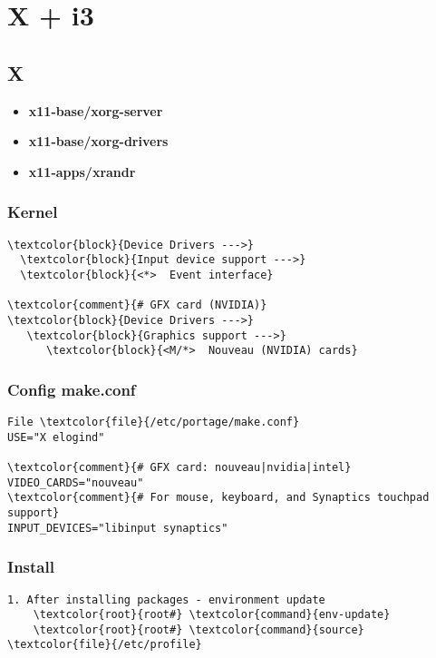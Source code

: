 \documentclass[10pt, a4paper, onecolumn, openany]{book}         %
\begin{document}
\chapter{X + i3}
\section{X}
\begin{itemize}
    \item \textbf{x11-base/xorg-server}
    \item \textbf{x11-base/xorg-drivers}
    \item \textbf{x11-apps/xrandr}
\end{itemize}

\subsection{Kernel}
\begin{Verbatim}[commandchars=\\\{\}]
\textcolor{block}{Device Drivers --->}
  \textcolor{block}{Input device support --->}
  \textcolor{block}{<*>  Event interface}
  
\textcolor{comment}{# GFX card (NVIDIA)}
\textcolor{block}{Device Drivers --->}
   \textcolor{block}{Graphics support --->}
      \textcolor{block}{<M/*>  Nouveau (NVIDIA) cards}
\end{Verbatim}

\subsection{Config make.conf}
\begin{Verbatim}[commandchars=\\\{\}]
File \textcolor{file}{/etc/portage/make.conf}
USE="X elogind"

\textcolor{comment}{# GFX card: nouveau|nvidia|intel}
VIDEO_CARDS="nouveau"
\textcolor{comment}{# For mouse, keyboard, and Synaptics touchpad support}
INPUT_DEVICES="libinput synaptics"
\end{Verbatim}

\subsection{Install}
\begin{Verbatim}[commandchars=\\\{\}]
1. After installing packages - environment update
    \textcolor{root}{root#} \textcolor{command}{env-update}
    \textcolor{root}{root#} \textcolor{command}{source} \textcolor{file}{/etc/profile}
\end{Verbatim}
\end{document}
